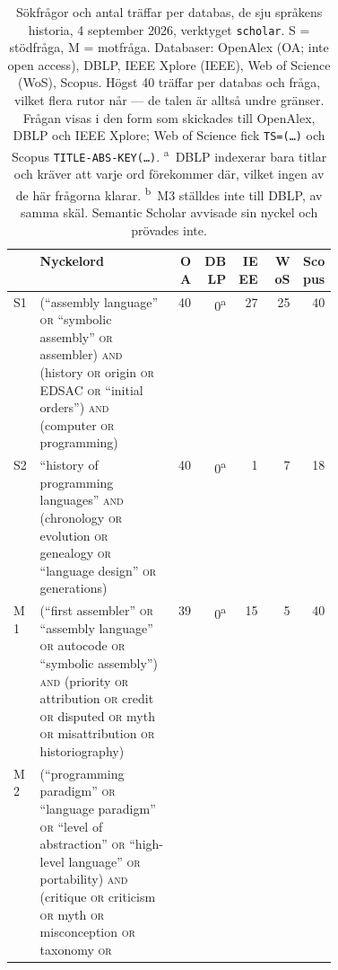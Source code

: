 \begin{table}[!htb]
  \caption{Sökfrågor och antal träffar per databas, de sju
    språkens historia, 4 september 2026, verktyget \texttt{scholar}.
    S = stödfråga, M = motfråga.  Databaser: OpenAlex (OA; inte
    \foreignlanguage{english}{open access}), DBLP, IEEE Xplore (IEEE),
    Web of Science (WoS), Scopus.  Högst 40 träffar per databas och fråga,
    vilket flera rutor når --- de talen är alltså undre gränser.  Frågan
    visas i den form som skickades till OpenAlex, DBLP och IEEE Xplore;
    Web of Science fick \texttt{TS=(\dots)} och Scopus
    \texttt{TITLE-ABS-KEY(\dots)}.  \textsuperscript{a}~DBLP indexerar bara
    titlar och kräver att varje ord förekommer där, vilket ingen av de här
    frågorna klarar.  \textsuperscript{b}~M3 ställdes inte till DBLP, av
    samma skäl.  Semantic Scholar avvisade sin nyckel och prövades
    inte.}
  \label{tab:sok-queries-sprak}
    \centering\footnotesize
    \begin{tabular}{@{}lp{0.42\linewidth}rrrrr@{}}
      \toprule
      & Nyckelord & OA & DBLP & IEEE & WoS & Scopus \\
      \midrule
      S1 & (\enquote{assembly language} \textsc{or} \enquote{symbolic
           assembly} \textsc{or} assembler) \textsc{and} (history
           \textsc{or} origin \textsc{or} EDSAC \textsc{or} \enquote{initial
           orders}) \textsc{and} (computer \textsc{or} programming)
         & 40 & 0\textsuperscript{a} & 27 & 25 & 40 \\
      S2 & \enquote{history of programming languages} \textsc{and}
           (chronology \textsc{or} evolution \textsc{or} genealogy
           \textsc{or} \enquote{language design} \textsc{or} generations)
         & 40 & 0\textsuperscript{a} & 1 & 7 & 18 \\
      \midrule
      M1 & (\enquote{first assembler} \textsc{or} \enquote{assembly
           language} \textsc{or} autocode \textsc{or} \enquote{symbolic
           assembly}) \textsc{and} (priority \textsc{or} attribution
           \textsc{or} credit \textsc{or} disputed \textsc{or} myth
           \textsc{or} misattribution \textsc{or} historiography)
         & 39 & 0\textsuperscript{a} & 15 & 5 & 40 \\
      M2 & (\enquote{programming paradigm} \textsc{or} \enquote{language
           paradigm} \textsc{or} \enquote{level of abstraction} \textsc{or}
           \enquote{high-level language} \textsc{or} portability)
           \textsc{and} (critique \textsc{or} criticism \textsc{or} myth
           \textsc{or} misconception \textsc{or} taxonomy \textsc{or}

\end{tabular}
\end{table}
